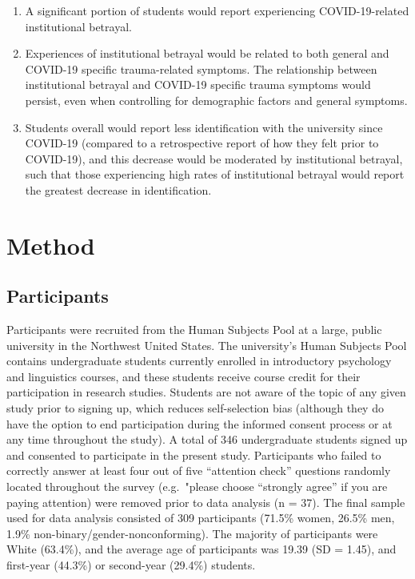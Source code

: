 \documentclass[
  english,
  man, noextraspace]{apa6}
\begin{document}
\begin{enumerate}
\def\labelenumi{\arabic{enumi}.}
\item
  A significant portion of students would report experiencing COVID-19-related institutional betrayal.
\item
  Experiences of institutional betrayal would be related to both general and COVID-19 specific trauma-related symptoms. The relationship between institutional betrayal and COVID-19 specific trauma symptoms would persist, even when controlling for demographic factors and general symptoms.
\item
  Students overall would report less identification with the university since COVID-19 (compared to a retrospective report of how they felt prior to COVID-19), and this decrease would be moderated by institutional betrayal, such that those experiencing high rates of institutional betrayal would report the greatest decrease in identification.
\end{enumerate}

\setlength{\parindent}{5ex}

\hypertarget{method}{%
\section{Method}\label{method}}

\hypertarget{participants}{%
\subsection{Participants}\label{participants}}

Participants were recruited from the Human Subjects Pool at a large, public university in the Northwest United States. The university's Human Subjects Pool contains undergraduate students currently enrolled in introductory psychology and linguistics courses, and these students receive course credit for their participation in research studies. Students are not aware of the topic of any given study prior to signing up, which reduces self-selection bias (although they do have the option to end participation during the informed consent process or at any time throughout the study). A total of 346 undergraduate students signed up and consented to participate in the present study. Participants who failed to correctly answer at least four out of five \enquote{attention check} questions randomly located throughout the survey (e.g.~"please choose \enquote{strongly agree} if you are paying attention) were removed prior to data analysis (n = 37). The final sample used for data analysis consisted of 309 participants (71.5\% women, 26.5\% men, 1.9\% non-binary/gender-nonconforming). The majority of participants were White (63.4\%), and the average age of participants was 19.39 (SD = 1.45), and first-year (44.3\%) or second-year (29.4\%) students.
\end{document}
